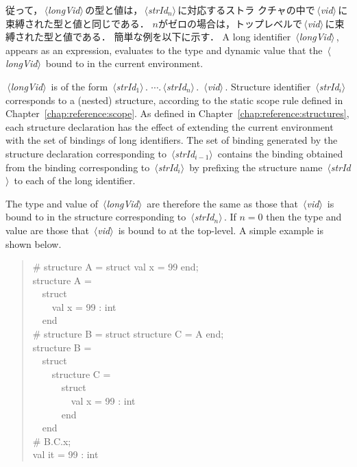 \documentclass{jbook}
\newcommand{\nonterm}[1]{\mbox{$\,\langle$}{\it #1}\mbox{$\rangle\,$}}
\newcommand{\myem}{\mbox{\ \ }}
\newenvironment{program}{\begin{quote}\begin{tt}}%
                        {\end{tt}\end{quote}}
\begin{document}
	従って，\nonterm{longVid}の型と値は，\nonterm{strId$_n$}に対応するストラ
クチャの中で\nonterm{vid}に束縛された型と値と同じである．
	$n$がゼロの場合は，トップレベルで\nonterm{vid}に束縛された型と値である．
	簡単な例を以下に示す．
\else%
	A long identifier \nonterm{longVid}, appears as an expression,
evaluates to the type and dynamic value that the \nonterm{longVid} bound
to in the current environment.

	\nonterm{longVid} is of the form 
\nonterm{strId$_1$}. $\cdots$.\nonterm{strId$_n$}. \nonterm{vid}.
	Structure identifier \nonterm{strId$_i$} corresponds to a
(nested) structure, according to the static scope rule defined in
Chapter~\ref{chap:reference:scope}. 
	As defined in Chapter~\ref{chap:reference:structures}, each structure
declaration has the effect of extending the current environment with 
the set of bindings of long identifiers.
	The set of binding generated by the structure declaration
corresponding to \nonterm{strId$_{i-1}$} contains the binding obtained
from the binding corresponding to \nonterm{strId$_i$} by prefixing the
structure name \nonterm{strId} to each of the long identifier.

	The type and value of \nonterm{longVid} are therefore the same
as those that \nonterm{vid} is bound to in the structure corresponding
to \nonterm{strId$_n$}.
	If $n = 0$  then the type and value are those that \nonterm{vid}
is bound to at the top-level.
	A simple example is shown below.
\fi%

\begin{program}
\# structure A = struct val x = 99 end;\\
structure A =\\
\myem  struct\\
\myem\myem    val x = 99 : int\\
\myem  end\\
\# structure B = struct structure C = A end;\\
structure B =\\
\myem  struct\\
\myem\myem    structure C =\\
\myem\myem\myem      struct\\
\myem\myem\myem\myem        val x = 99 : int\\
\myem\myem\myem      end\\
\myem  end\\
\# B.C.x;\\
val it = 99 : int\\
\end{program}
\end{document}
